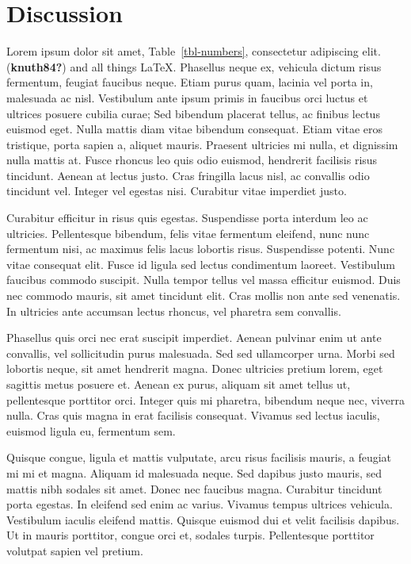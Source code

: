 \documentclass[
  oneside,
  open=any]{scrbook}
\begin{document}
\hypertarget{discussion}{%
\chapter{Discussion}\label{discussion}}

Lorem ipsum dolor sit amet, Table~\ref{tbl-numbers}, consectetur
adipiscing elit. (\textbf{knuth84?}) and all things LaTeX. Phasellus
neque ex, vehicula dictum risus fermentum, feugiat faucibus neque. Etiam
purus quam, lacinia vel porta in, malesuada ac nisl. Vestibulum ante
ipsum primis in faucibus orci luctus et ultrices posuere cubilia curae;
Sed bibendum placerat tellus, ac finibus lectus euismod eget. Nulla
mattis diam vitae bibendum consequat. Etiam vitae eros tristique, porta
sapien a, aliquet mauris. Praesent ultricies mi nulla, et dignissim
nulla mattis at. Fusce rhoncus leo quis odio euismod, hendrerit
facilisis risus tincidunt. Aenean at lectus justo. Cras fringilla lacus
nisl, ac convallis odio tincidunt vel. Integer vel egestas nisi.
Curabitur vitae imperdiet justo.

Curabitur efficitur in risus quis egestas. Suspendisse porta interdum
leo ac ultricies. Pellentesque bibendum, felis vitae fermentum eleifend,
nunc nunc fermentum nisi, ac maximus felis lacus lobortis risus.
Suspendisse potenti. Nunc vitae consequat elit. Fusce id ligula sed
lectus condimentum laoreet. Vestibulum faucibus commodo suscipit. Nulla
tempor tellus vel massa efficitur euismod. Duis nec commodo mauris, sit
amet tincidunt elit. Cras mollis non ante sed venenatis. In ultricies
ante accumsan lectus rhoncus, vel pharetra sem convallis.

Phasellus quis orci nec erat suscipit imperdiet. Aenean pulvinar enim ut
ante convallis, vel sollicitudin purus malesuada. Sed sed ullamcorper
urna. Morbi sed lobortis neque, sit amet hendrerit magna. Donec
ultricies pretium lorem, eget sagittis metus posuere et. Aenean ex
purus, aliquam sit amet tellus ut, pellentesque porttitor orci. Integer
quis mi pharetra, bibendum neque nec, viverra nulla. Cras quis magna in
erat facilisis consequat. Vivamus sed lectus iaculis, euismod ligula eu,
fermentum sem.

Quisque congue, ligula et mattis vulputate, arcu risus facilisis mauris,
a feugiat mi mi et magna. Aliquam id malesuada neque. Sed dapibus justo
mauris, sed mattis nibh sodales sit amet. Donec nec faucibus magna.
Curabitur tincidunt porta egestas. In eleifend sed enim ac varius.
Vivamus tempus ultrices vehicula. Vestibulum iaculis eleifend mattis.
Quisque euismod dui et velit facilisis dapibus. Ut in mauris porttitor,
congue orci et, sodales turpis. Pellentesque porttitor volutpat sapien
vel pretium.
\end{document}
